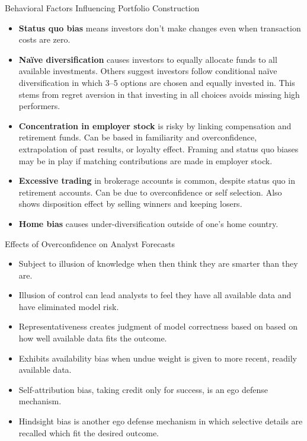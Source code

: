 \documentclass[../custom]{flashcards}
\newcommand{\studyArea}{Behavioral Finance}
\begin{document}
\begin{flashcard}[\studyArea]{Behavioral Factors Influencing Portfolio Construction}
    \begin{itemize}
        \item \textbf{Status quo bias} means investors don't make changes even when transaction costs are zero.
        \item \textbf{Na\"{i}ve diversification} causes investors to equally allocate funds to all available investments. Others suggest investors follow conditional na\"{i}ve diversification in which 3--5 options are chosen and equally invested in. This stems from regret aversion in that investing in all choices avoids missing high performers.
        \item \textbf{Concentration in employer stock} is risky by linking compensation and retirement funds. Can be based in familiarity and overconfidence, extrapolation of past results, or loyalty effect. Framing and status quo biases may be in play if matching contributions are made in employer stock.
        \item \textbf{Excessive trading} in brokerage accounts is common, despite status quo in retirement accounts. Can be due to overconfidence or self selection. Also shows disposition effect by selling winners and keeping losers.
        \item \textbf{Home bias} causes under-diversification outside of one's home country.
    \end{itemize}
\end{flashcard}

\begin{flashcard}[\studyArea]{Effects of Overconfidence on Analyst Forecasts}
    \begin{itemize}
        \item Subject to illusion of knowledge when then think they are smarter than they are.
        \item Illusion of control can lead analysts to feel they have all available data and have eliminated model risk.
        \item Representativeness creates judgment of model correctness based on based on how well available data fits the outcome.
        \item Exhibits availability bias when undue weight is given to more recent, readily available data.
        \item Self-attribution bias, taking credit only for success, is an ego defense mechanism.
        \item Hindsight bias is another ego defense mechanism in which selective details are recalled which fit the desired outcome.
    \end{itemize}
\end{flashcard}
\end{document}
